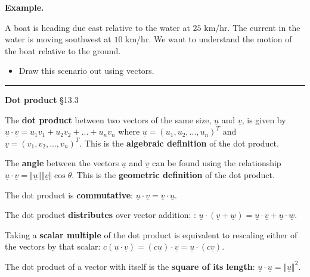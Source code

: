 \documentclass[12pt,letterpaper,noanswers]{exam}
\newcommand{\mb}[1]{\underline{#1}}
\begin{document}
\noindent\textbf{Example.}  

A boat is heading due east relative to the water at $25$ km/hr.  The current in the water is moving southwest at $10$ km/hr.  We want to understand the motion of the boat relative to the ground.

\begin{itemize}
\item Draw this scenario out using vectors.
\vspace{2.5cm}


\vspace{1.5cm}

\end{itemize}

\vspace{0.2cm}
\hrule
\vspace{0.2cm}

\noindent\textbf{Dot product} \S 13.3
\begin{tcolorbox}
The \textbf{dot product} between two vectors of the same size, $\underline{u}$ and $\underline{v}$, is given by $\underline{u}\cdot\underline{v} = u_1v_1+u_2v_2+...+u_nv_n$ where $\underline{u} = (u_1, u_2,...,u_n)^T$ and $\underline{v} = (v_1, v_2, ..., v_n)^T$.  This is the \textbf{algebraic definition} of the dot product.

The \textbf{angle} between the vectors $\underline{u}$ and $\underline{v}$ can be found using the relationship 
$\underline{u}\cdot\underline{v} = \Vert \underline{u}\Vert\Vert\underline{v}\Vert\cos\theta$.  This is the \textbf{geometric definition} of the dot product.
\end{tcolorbox}
\begin{tcolorbox}
The dot product is \textbf{commutative}: $\underline{u}\cdot\underline{v} =\underline{v}\cdot\underline{u}.$

The dot product \textbf{distributes} over vector addition: : $\underline{u}\cdot(\underline{v}+\underline{w}) =\underline{u}\cdot\underline{v}+\underline{u}\cdot\underline{w}.$

Taking a \textbf{scalar multiple} of the dot product is equivalent to rescaling either of the vectors by that scalar: $c(\mb{u}\cdot\mb{v}) = (c\mb{u})\cdot\mb{v} = \mb{u}\cdot(c\mb{v})$.

The dot product of a vector with itself is the \textbf{square of its length}: $\underline{u}\cdot\underline{u} =\Vert \underline{u} \Vert^2$.

\end{tcolorbox}
\end{document}
